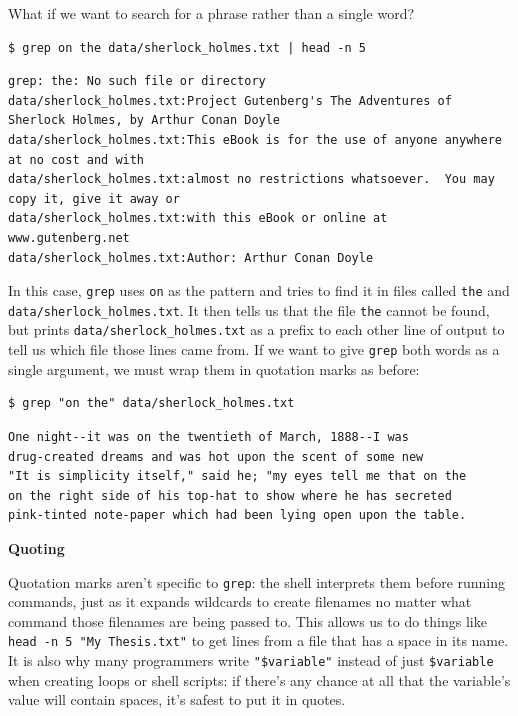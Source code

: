 \documentclass[
]{krantz}
\renewenvironment{quote}{\begin{VF}}{\end{VF}}
\begin{document}
What if we want to search for a phrase rather than a single word?

\begin{verbatim}
$ grep on the data/sherlock_holmes.txt | head -n 5
\end{verbatim}

\begin{verbatim}
grep: the: No such file or directory
data/sherlock_holmes.txt:Project Gutenberg's The Adventures of Sherlock Holmes, by Arthur Conan Doyle
data/sherlock_holmes.txt:This eBook is for the use of anyone anywhere at no cost and with
data/sherlock_holmes.txt:almost no restrictions whatsoever.  You may copy it, give it away or
data/sherlock_holmes.txt:with this eBook or online at www.gutenberg.net
data/sherlock_holmes.txt:Author: Arthur Conan Doyle
\end{verbatim}

In this case,
\texttt{grep} uses \texttt{on} as the pattern
and tries to find it in files called \texttt{the} and \texttt{data/sherlock\_holmes.txt}.
It then tells us that the file \texttt{the} cannot be found,
but prints \texttt{data/sherlock\_holmes.txt} as a prefix to each other line of output
to tell us which file those lines came from.
If we want to give \texttt{grep} both words as a single argument,
we must wrap them in quotation marks as before:

\begin{verbatim}
$ grep "on the" data/sherlock_holmes.txt
\end{verbatim}

\begin{verbatim}
One night--it was on the twentieth of March, 1888--I was
drug-created dreams and was hot upon the scent of some new
"It is simplicity itself," said he; "my eyes tell me that on the
on the right side of his top-hat to show where he has secreted
pink-tinted note-paper which had been lying open upon the table.
\end{verbatim}

\begin{quote}
\textbf{Quoting}

Quotation marks aren't specific to \texttt{grep}:
the shell interprets them before running commands,
just as it expands wildcards to create filenames
no matter what command those filenames are being passed to.
This allows us to do things like \texttt{head\ -n\ 5\ "My\ Thesis.txt"}
to get lines from a file that has a space in its name.
It is also why many programmers write \texttt{"\$variable"} instead of just \texttt{\$variable}
when creating loops or shell scripts:
if there's any chance at all that the variable's value will contain spaces,
it's safest to put it in quotes.
\end{quote}
\end{document}
